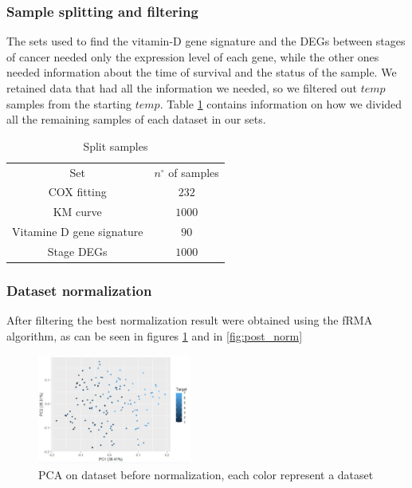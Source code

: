 \documentclass[fleqn,10pt]{SelfArx} %
\begin{document}
		\subsubsection{Sample splitting and filtering}
		The sets used to find the vitamin-D gene signature and the DEGs between stages of cancer needed only the expression level of each gene, while the other ones needed information about the time of survival and the status of the sample.
		We retained data that had all the information we needed, so we filtered out $temp$ samples from the starting $temp$.
		Table \ref{tab:samples_split} contains information on how we divided all the remaining samples of each dataset in our sets.

		\begin{table}[H]
			\centering
			\begin{tabular}{cc}
				\hline
				Set & $n^\circ$ of samples\\
				COX fitting & $232$\\
				KM curve & $1000$\\
				Vitamine D gene signature & $90$\\
				Stage DEGs & $1000$\\
				\hline
			\end{tabular}
			\caption{Split samples}
			\label{tab:samples_split}
		\end{table}

		\subsubsection{Dataset normalization}
		After filtering the best normalization result were obtained using the fRMA algorithm, as can be seen in figures \ref{fig:pre_norm} and in \ref{fig:post_norm}

		\begin{figure}[ht]
			\includegraphics[width=0.45\textwidth]{figures/pre_norm.png}
			\caption{PCA on dataset before normalization, each color represent a dataset}
			\label{fig:pre_norm}
		\end{figure}
\end{document}

